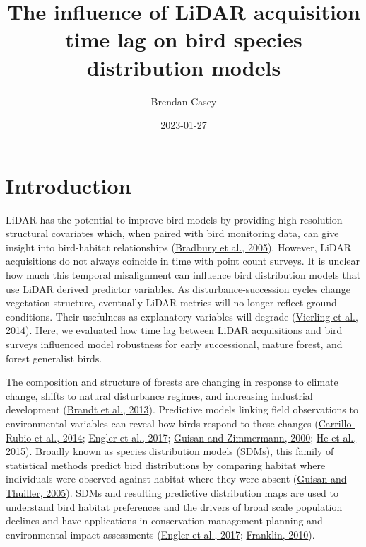 \documentclass[
]{article}
\title{The influence of LiDAR acquisition time lag on bird species distribution models}
\author{Brendan Casey}
\date{2023-01-27}
\begin{document}
\maketitle

{
\hypersetup{linkcolor=}
\setcounter{tocdepth}{2}
\tableofcontents
}
\hypertarget{introduction}{%
\section{Introduction}\label{introduction}}

LiDAR has the potential to improve bird models by providing high resolution structural covariates which, when paired with bird monitoring data, can give insight into bird-habitat relationships (\protect\hyperlink{ref-Bradbury2005}{Bradbury et al., 2005}). However, LiDAR acquisitions do not always coincide in time with point count surveys. It is unclear how much this temporal misalignment can influence bird distribution models that use LiDAR derived predictor variables. As disturbance-succession cycles change vegetation structure, eventually LiDAR metrics will no longer reflect ground conditions. Their usefulness as explanatory variables will degrade (\protect\hyperlink{ref-VierlingSwift2014}{Vierling et al., 2014}). Here, we evaluated how time lag between LiDAR acquisitions and bird surveys influenced model robustness for early successional, mature forest, and forest generalist birds.

The composition and structure of forests are changing in response to climate change, shifts to natural disturbance regimes, and increasing industrial development (\protect\hyperlink{ref-Brandt2013}{Brandt et al., 2013}). Predictive models linking field observations to environmental variables can reveal how birds respond to these changes (\protect\hyperlink{ref-Carrillo-Rubio2014}{Carrillo-Rubio et al., 2014}; \protect\hyperlink{ref-englerAvianSDMsCurrent2017}{Engler et al., 2017}; \protect\hyperlink{ref-guisanPredictiveHabitatDistribution2000}{Guisan and Zimmermann, 2000}; \protect\hyperlink{ref-He2015}{He et al., 2015}). Broadly known as species distribution models (SDMs), this family of statistical methods predict bird distributions by comparing habitat where individuals were observed against habitat where they were absent (\protect\hyperlink{ref-Guisan2005}{Guisan and Thuiller, 2005}). SDMs and resulting predictive distribution maps are used to understand bird habitat preferences and the drivers of broad scale population declines and have applications in conservation management planning and environmental impact assessments (\protect\hyperlink{ref-englerAvianSDMsCurrent2017}{Engler et al., 2017}; \protect\hyperlink{ref-franklinMappingSpeciesDistributions2010}{Franklin, 2010}).
\end{document}
